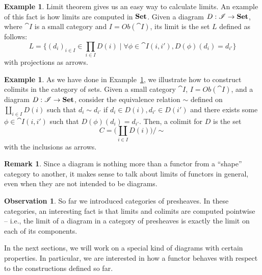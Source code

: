 \documentclass[a4paper, twoside,openright]{report}
\theoremstyle{plain}
\theoremstyle{definition}
\newtheorem{example}[theorem]{Example}
\newtheorem{remark}[theorem]{Remark}
\newtheorem{obs}[theorem]{Observation}
\begin{document}
\begin{example}\label{ex:lim_of_sets}
    Limit theorem gives us an easy way to calculate limits. An example of this fact is how limits are computed in $\mathbf{Set}$. Given a diagram $D: \mathscr{I} \rightarrow \mathbf{Set}$, where $\cat I$ is a small category and $I = Ob(\cat I)$, its limit is the set $L$ defined as follows:
    $$
        L = \{ (d_i)_{i \in I} \in \prod_{i \in I}D(i) \mid \forall \phi \in \cat I(i, i'), D(\phi)(d_i) = d_{i'} \}
    $$
    with projections as arrows.
\end{example}

\begin{example}\label{ex:colm_of_sets}
    As we have done in Example~\ref{ex:lim_of_sets}, we illustrate how to construct colimits in the category of sets. Given a small category $\cat I$, $ I = Ob(\cat I)$, and a diagram $D: \mathscr{I} \rightarrow \mathbf{Set}$, consider the equivalence relation $\sim$ defined on $\coprod_{i\in I} D(i)$ such that $d_i \sim d_{i'}$ if $d_i \in D(i), d_{i'} \in D(i')$ and there exists some $\phi \in \cat I(i, i')$ such that $D(\phi)(d_i) = d_{i'}$. Then, a colimit for $D$ is the set
    $$
        C = \big ( \coprod_{i \in I} D(i) \big ) / \sim
    $$
    with the inclusions as arrows.
\end{example}

\begin{remark}
    Since a diagram is nothing more than a functor from a ``shape'' category to another, it makes sense to talk about limits of functors in general, even when they are not intended to be diagrams.
\end{remark}

\begin{obs}\label{obs:limits_in_presh}
    So far we introduced categories of presheaves. In these categories, an interesting fact is that limits and colimits are computed pointwise -- i.e., the limit of a diagram in a category of presheaves is exactly the limit on each of its components.
\end{obs}

In the next sections, we will work on a special kind of diagrams with certain properties. In particular, we are interested in how a functor behaves with respect to the constructions defined so far.
\end{document}
